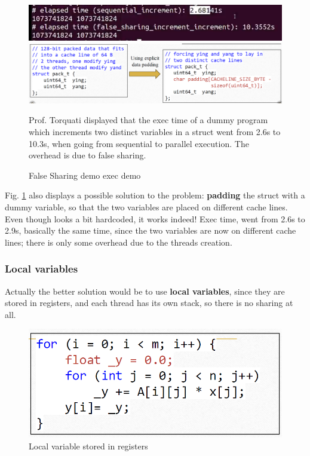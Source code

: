 \begin{figure}[htbp]
   \centering
   \includegraphics{images/04/false_sharing_demo.png}
   \includegraphics{images/04/false_sharing_program.png}
   \caption{False Sharing demo exec demo}
   \label{fig:04/false_sharing_demo}
   Prof. Torquati displayed that the exec time of a dummy program which increments two distinct variables in a struct went from 2.6s to 10.3s, when going from sequential to parallel execution. The overhead is due to false sharing.
\end{figure}

Fig. \ref{fig:04/false_sharing_demo} also displays a possible solution to the problem: \textbf{padding} the struct with a dummy variable, so that the two variables are placed on different cache lines. Even though looks a bit hardcoded, it works indeed!
Exec time, went from 2.6s to 2.9s, basically the same time, since the two variables are now on different cache lines; there is only some overhead due to the threads creation.


\subsubsection{Local variables}

\begin{paracol}{2}

   \colfill
   Actually the better solution would be to use \textbf{local variables}, since they are stored in registers, and each thread has its own stack, so there is no sharing at all.
   \colfill

   \switchcolumn
   
   \begin{figure}[htbp]
      \centering
      \includegraphics{images/04/false_sharing_local.png}
      \caption{Local variable stored in registers}
      \label{fig:false_sharing_local}
   \end{figure}
\end{paracol}
      

